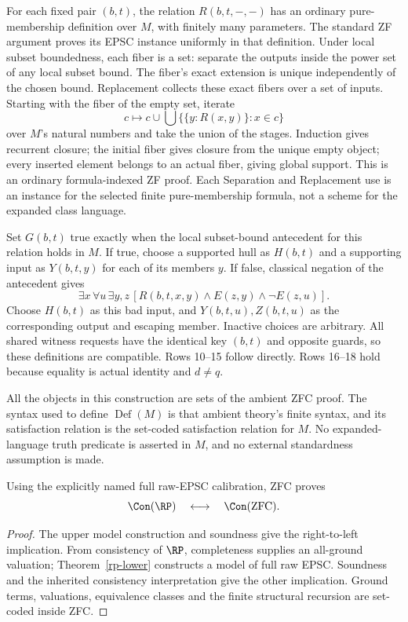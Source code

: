 For each fixed pair $(b,t)$, the relation $R(b,t,-,-)$ has an ordinary
pure-membership definition over $M$, with finitely many parameters.
The standard ZF argument proves its EPSC instance uniformly in that
definition. Under local subset boundedness, each fiber is a set:
separate the outputs inside the power set of any local subset bound.
The fiber's exact extension is unique independently of the chosen bound.
Replacement collects these exact fibers over a set of inputs. Starting
with the fiber of the empty set, iterate
\[
 c\longmapsto c\cup\bigcup\{\{y:R(x,y)\}:x\in c\}
\]
over $M$'s natural numbers and take the union of the stages. Induction
gives recurrent closure; the initial fiber gives closure from the unique
empty object; every inserted element belongs to an actual fiber, giving
global support. This is an ordinary formula-indexed ZF proof. Each
Separation and Replacement use is an instance for the selected finite
pure-membership formula, not a scheme for the expanded class language.

Set $G(b,t)$ true exactly when the local subset-bound antecedent for
this relation holds in $M$. If true, choose a supported hull as $H(b,t)$
and a supporting input as $Y(b,t,y)$ for each of its members $y$.
If false, classical negation of the antecedent gives
\[
 \exists x\,\forall u\,\exists y,z\,
       [R(b,t,x,y)\land E(z,y)\land\neg E(z,u)].
\]
Choose $H(b,t)$ as this bad input, and $Y(b,t,u),Z(b,t,u)$ as the
corresponding output and escaping member. Inactive choices are arbitrary.
All shared witness requests have the identical key $(b,t)$ and opposite
guards, so these definitions are compatible. Rows 10--15 follow directly.
Rows 16--18 hold because equality is actual identity and $d\ne q$.

All the objects in this construction are sets of the ambient ZFC proof.
The syntax used to define $\operatorname{Def}(M)$ is that ambient
theory's finite syntax, and its satisfaction relation is the set-coded
satisfaction relation for $M$. No expanded-language truth predicate is
asserted in $M$, and no external standardness assumption is made.

\begin{theorem}\label{rp-main}
Using the explicitly named full raw-EPSC calibration, ZFC proves
\[
 \Con(\RP)\quad\longleftrightarrow\quad\Con(\mathrm{ZFC}).
\]
\end{theorem}
\begin{proof}
The upper model construction and soundness give the right-to-left
implication. From consistency of $\RP$, completeness supplies an
all-ground valuation; Theorem~\ref{rp-lower} constructs a model of
full raw EPSC. Soundness and the inherited consistency interpretation
give the other implication. Ground terms, valuations, equivalence
classes and the finite structural recursion are set-coded inside ZFC.
\end{proof}

